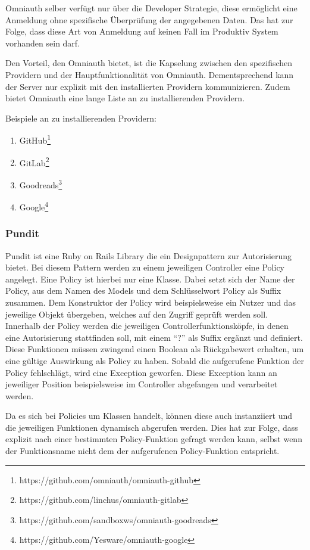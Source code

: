 Omniauth selber verfügt nur über die Developer Strategie, diese ermöglicht eine Anmeldung ohne spezifische Überprüfung der angegebenen Daten. Das hat zur Folge, dass diese Art von Anmeldung auf keinen Fall im Produktiv System vorhanden sein darf.

Den Vorteil, den Omniauth bietet, ist die Kapselung zwischen den spezifischen Providern und der Hauptfunktionalität von Omniauth. Dementsprechend kann der Server nur explizit mit den installierten Providern kommunizieren. Zudem bietet Omniauth eine lange Liste an zu installierenden Providern.

Beispiele an zu installierenden Providern:
\begin{enumerate}
	\item GitHub\footnote{https://github.com/omniauth/omniauth-github}
	\item GitLab\footnote{https://github.com/linchus/omniauth-gitlab}
	\item Goodreads\footnote{https://github.com/sandboxws/omniauth-goodreads}
	\item Google\footnote{https://github.com/Yesware/omniauth-google}
\end{enumerate}

\subsubsection{Pundit}
\label{sec: pundit}
Pundit ist eine Ruby on Rails Library die ein Designpattern zur Autorisierung bietet. Bei diesem Pattern werden zu einem jeweiligen Controller eine Policy angelegt. Eine Policy ist hierbei nur eine Klasse. Dabei setzt sich der Name der Policy, aus dem Namen des Models und dem Schlüsselwort Policy als Suffix zusammen. Dem Konstruktor der Policy wird beispielsweise ein Nutzer und das jeweilige Objekt übergeben, welches auf den Zugriff geprüft werden soll. Innerhalb der Policy werden die jeweiligen Controllerfunktionsköpfe, in denen eine Autorisierung stattfinden soll, mit einem \enquote{?} als Suffix ergänzt und definiert. Diese Funktionen müssen zwingend einen Boolean als Rückgabewert erhalten, um eine gültige Auswirkung als Policy zu haben. Sobald die aufgerufene Funktion der Policy fehlschlägt, wird eine Exception geworfen. Diese Exception kann an jeweiliger Position beispielsweise im Controller abgefangen und verarbeitet werden.

Da es sich bei Policies um Klassen handelt, können diese auch instanziiert und die jeweiligen Funktionen dynamisch abgerufen werden. Dies hat zur Folge, dass explizit nach einer bestimmten Policy-Funktion gefragt werden kann, selbst wenn der Funktionsname nicht dem der aufgerufenen Policy-Funktion entspricht.

